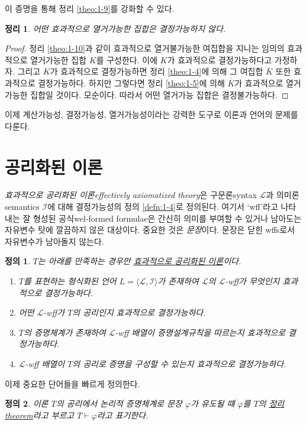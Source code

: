 \documentclass[a4paper,chapter,atbegshi]{oblivoir}
\newtheorem{defn}{정의}[chapter]
\newtheorem{theo}{정리}[chapter]
\begin{document}
이 증명을 통해 정리 \ref{theo:1-9}를 강화할 수 있다.
\begin{theo}
  어떤 효과적으로 열거가능한 집합은 결정가능하지 않다.
\end{theo}
\begin{proof}
  정리 \ref{theo:1-10}과 같이 효과적으로 열거불가능한 여집합을 지니는 임의의
  효과적으로 열거가능한 집합 $K$를 구성한다. 이에 $K$가 효과적으로 결정가능하다고
  가정하자. 그리고 $K$가 효과적으로 결정가능하면 정리 \ref{theo:1-4}에 의해
  그 여집합 $\overline{K}$ 또한 효과적으로 결정가능하다. 하지만 그렇다면
  정리 \ref{theo:1-5}에 의해 $\overline{K}$가 효과적으로 열거가능한 집합일 것이다.
  모순이다. 따라서 어떤 열거가능 집합은 결정불가능하다.
\end{proof}
이제 계산가능성, 결정가능성, 열거가능성이라는 강력한 도구로 이론과 언어의
문제를 다룬다.
\section{공리화된 이론}
\emph{효과적으로 공리화된 이론\tiny effectively axiomatized theory}은 
구문론{\tiny syntax} $\mathcal{L}$과 의미론{\tiny semantics} $\mathcal{I}$에 대해
결정가능성의 정의 \ref{defn:1-4}로 정의된다.
여기서 `wff'라고 나타내는 잘 형성된 공식{\tiny wel-formed formulae}은 
간신히 의미를 부여할 수 있거나 남아도는 자유변수 탓에 깔끔하지 않은 대상이다. 
중요한 것은 \emph{문장}이다. 문장은 닫힌 wffs로서 자유변수가 남아돌지 않는다.
\begin{defn}\label{defn:1-7}
  $T$는 아래를 만족하는 경우만
  \underline{효과적으로 공리화된 이론}이다.
  \begin{enumerate}
    \item $T$를 표현하는 형식화된 언어 $L=\langle\mathcal{L},\mathcal{I}
      \rangle$가 존재하여 $\mathcal{L}$의 $\mathcal{L}$-wff가 무엇인지 
      효과적으로 결정가능하다.
    \item 어떤 $\mathcal{L}$-wff가 $T$의 공리인지 효과적으로 결정가능하다. 
    \item $T$의 증명체계가 존재하여 $\mathcal{L}$-wff 배열이 증명설계규칙을
      따르는지 효과적으로 결정가능하다.
    \item $\mathcal{L}$-wff 배열이 $T$의 공리로 증명을 구성할 수 있는지
      효과적으로 결정가능하다.
  \end{enumerate}
\end{defn}
이제 중요한 단어들을 빠르게 정의한다. 
\begin{defn}\label{defn:1-8}
  이론 $T$의 공리에서 논리적 증명체계로 문장 $\varphi$가 유도될 떄
  $\varphi$를 $T$의 \underline{정리\tiny theorem}라고 부르고
  $T\vdash\varphi$라고 표기한다. 
\end{defn}
\end{document}

